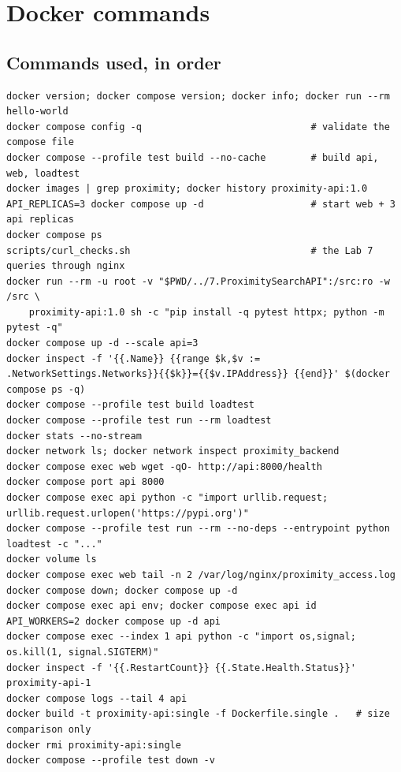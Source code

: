 \documentclass[11pt,a4paper]{article}
\begin{document}
\section{Docker commands}

\subsection{Commands used, in order}
\begin{lstlisting}[numbers=none]
docker version; docker compose version; docker info; docker run --rm hello-world
docker compose config -q                              # validate the compose file
docker compose --profile test build --no-cache        # build api, web, loadtest
docker images | grep proximity; docker history proximity-api:1.0
API_REPLICAS=3 docker compose up -d                   # start web + 3 api replicas
docker compose ps
scripts/curl_checks.sh                                # the Lab 7 queries through nginx
docker run --rm -u root -v "$PWD/../7.ProximitySearchAPI":/src:ro -w /src \
    proximity-api:1.0 sh -c "pip install -q pytest httpx; python -m pytest -q"
docker compose up -d --scale api=3
docker inspect -f '{{.Name}} {{range $k,$v := .NetworkSettings.Networks}}{{$k}}={{$v.IPAddress}} {{end}}' $(docker compose ps -q)
docker compose --profile test build loadtest
docker compose --profile test run --rm loadtest
docker stats --no-stream
docker network ls; docker network inspect proximity_backend
docker compose exec web wget -qO- http://api:8000/health
docker compose port api 8000
docker compose exec api python -c "import urllib.request; urllib.request.urlopen('https://pypi.org')"
docker compose --profile test run --rm --no-deps --entrypoint python loadtest -c "..."
docker volume ls
docker compose exec web tail -n 2 /var/log/nginx/proximity_access.log
docker compose down; docker compose up -d
docker compose exec api env; docker compose exec api id
API_WORKERS=2 docker compose up -d api
docker compose exec --index 1 api python -c "import os,signal; os.kill(1, signal.SIGTERM)"
docker inspect -f '{{.RestartCount}} {{.State.Health.Status}}' proximity-api-1
docker compose logs --tail 4 api
docker build -t proximity-api:single -f Dockerfile.single .   # size comparison only
docker rmi proximity-api:single
docker compose --profile test down -v
\end{lstlisting}
\end{document}
